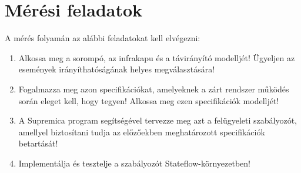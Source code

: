 \chapter{Mérési feladatok}\label{sect:LatexTools}
%

A mérés folyamán az alábbi feladatokat kell elvégezni:
\begin{enumerate}
	\item Alkossa meg a sorompó, az infrakapu és a távirányító modelljét! Ügyeljen az események irányíthatóságának helyes megválasztására!
	\item Fogalmazza meg azon specifikációkat, amelyeknek a zárt rendszer működés során eleget kell, hogy tegyen! Alkossa meg ezen specifikációk modelljét!
	\item A Supremica program segítségével tervezze meg azt a felügyeleti szabályozót, amellyel biztosítani tudja az előzőekben meghatározott specifikációk betartását!
	\item Implementálja és tesztelje a szabályozót Stateflow-környezetben!
\end{enumerate}
